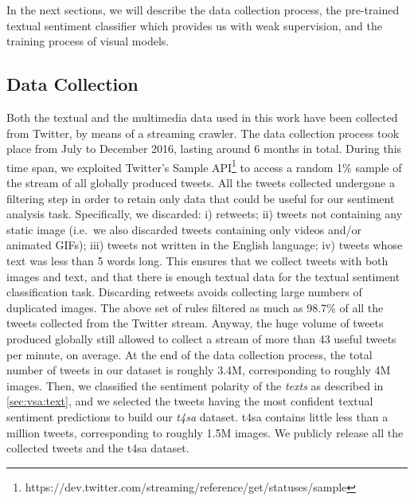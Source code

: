 In the next sections, we will describe the data collection process, the pre-trained textual sentiment classifier which provides us with weak supervision, and the training process of visual models.



\subsection{Data Collection}
\label{sec:vsa:dataset}
Both the textual and the multimedia data used in this work have been collected from Twitter, by means of a streaming crawler.
The data collection process took place from July to December 2016, lasting around 6 months in total.
During this time span, we exploited Twitter's Sample API\footnote{https://dev.twitter.com/streaming/reference/get/statuses/sample} to access a random 1\% sample of the stream of all globally produced tweets.
All the tweets collected undergone a filtering step in order to retain only data that could be useful for our sentiment analysis task.
Specifically, we discarded: i) retweets; ii) tweets not containing any static image (i.e.\ we also discarded tweets containing only videos and/or animated GIFs); iii) tweets not written in the English language; iv) tweets whose text was less than 5 words long.
This ensures that we collect tweets with both images and text, and that there is enough textual data for the textual sentiment classification task.
Discarding retweets avoids collecting large numbers of duplicated images.
The above set of rules filtered as much as 98.7\% of all the tweets collected from the Twitter stream.
Anyway, the huge volume of tweets produced globally still allowed to collect a stream of more than 43 useful tweets per minute, on average.
At the end of the data collection process, the total number of tweets in our dataset is roughly 3.4M, corresponding to roughly 4M images.
Then, we classified the sentiment polarity of the \emph{texts} as described in \ref{sec:vsa:text}, and we selected the tweets having the most confident textual sentiment predictions to build our \emph{\acrfull{t4sa}} dataset.
\gls{t4sa} contains little less than a million tweets, corresponding to roughly 1.5M images.
We publicly release all the collected tweets and the \gls{t4sa} dataset.

